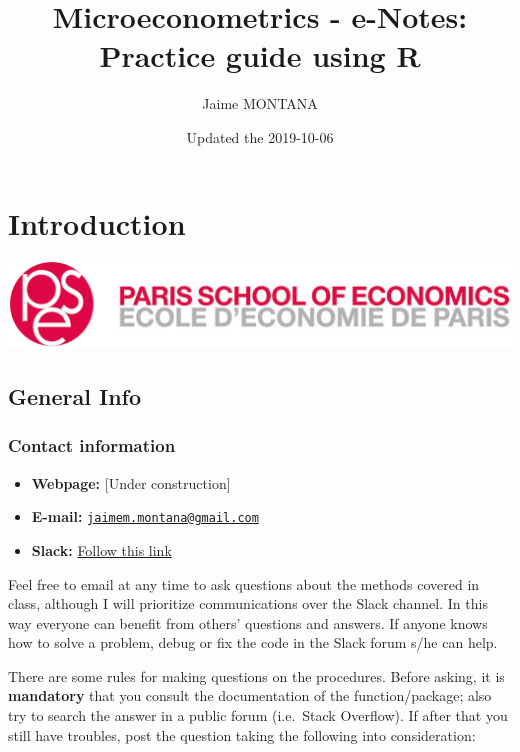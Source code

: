 \documentclass[]{book}
\title{Microeconometrics - e-Notes: Practice guide using R}
\author{Jaime MONTANA}
\date{Updated the 2019-10-06}
\providecommand{\tightlist}{%
  \setlength{\itemsep}{0pt}\setlength{\parskip}{0pt}}
\begin{document}
\maketitle

{
\setcounter{tocdepth}{1}
\tableofcontents
}
\chapter{Introduction}\label{introduction}

\begin{center}\includegraphics[width=0.9\linewidth]{./images/1200px-Logo_pse_petit} \end{center}

\section{General Info}\label{general-info}

\subsection{Contact information}\label{contact-information}

\begin{itemize}
\tightlist
\item
  \textbf{Webpage:} {[}Under construction{]}
\item
  \textbf{E-mail:}
  \href{mailto:jaimem.montana@gmail.com}{\nolinkurl{jaimem.montana@gmail.com}}
\item
  \textbf{Slack:}
  \href{https://join.slack.com/t/psemicecometrics19/shared_invite/enQtNzY4NTYyMTM2MTMzLTM5ZmVmNTRjYTg3NzVkZTg4YzQzNjU3OTllZTFkODJjYzA0MWE0MTZkOTFlZmZhODhiMmViZWNlYzRiZWI1ZjU}{Follow
  this link}
\end{itemize}

Feel free to email at any time to ask questions about the methods
covered in class, although I will prioritize communications over the
Slack channel. In this way everyone can benefit from others' questions
and answers. If anyone knows how to solve a problem, debug or fix the
code in the Slack forum s/he can help.

There are some rules for making questions on the procedures. Before
asking, it is \textbf{mandatory} that you consult the documentation of
the function/package; also try to search the answer in a public forum
(i.e.~Stack Overflow). If after that you still have troubles, post the
question taking the following into consideration:
\end{document}
